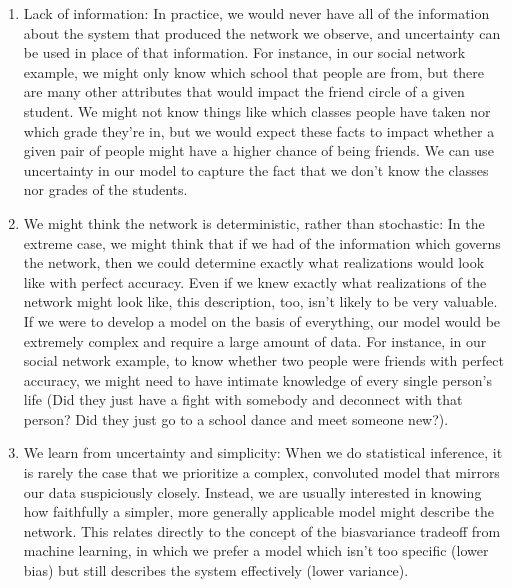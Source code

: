 \documentclass[letterpaper,10pt,english]{jupyterBook}
\begin{document}
\begin{enumerate}
%
\item {} 
\sphinxAtStartPar
Lack of information: In practice, we would never have all of the information about the system that produced the network we observe, and uncertainty can be used in place of that information. For instance, in our social network example, we might only know which school that people are from, but there are many other attributes that would impact the friend circle of a given student. We might not know things like which classes people have taken nor which grade they’re in, but we would expect these facts to impact whether a given pair of people might have a higher chance of being friends. We can use uncertainty in our model to capture the fact that we don’t know the classes nor grades of the students.

\item {} 
\sphinxAtStartPar
We might think the network is deterministic, rather than stochastic: In the extreme case, we might think that if we had  of the information which governs the network, then we could determine exactly what realizations would look like with perfect accuracy. Even if we knew exactly what realizations of the network might look like, this description, too, isn’t likely to be very valuable. If we were to develop a model on the basis of everything, our model would be extremely complex and require a large amount of data. For instance, in our social network example, to know whether two people were friends with perfect accuracy, we might need to have intimate knowledge of every single person’s life (Did they just have a fight with somebody and de\sphinxhyphen{}connect with that person? Did they just go to a school dance and meet someone new?).

\item {} 
\sphinxAtStartPar
We learn from uncertainty and simplicity: When we do statistical inference, it is rarely the case that we prioritize a complex, convoluted model that mirrors our data suspiciously closely. Instead, we are usually interested in knowing how faithfully a simpler, more generally applicable model might describe the network. This relates directly to the concept of the bias\sphinxhyphen{}variance tradeoff from machine learning, in which we prefer a model which isn’t too specific (lower bias) but still describes the system effectively (lower variance).

\end{enumerate}
\end{document}
